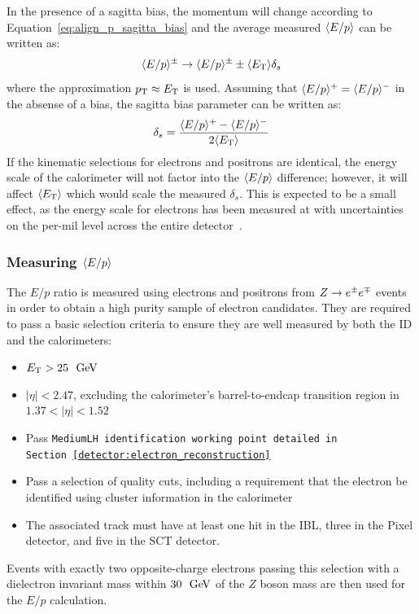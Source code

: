 In the presence of a sagitta bias, the momentum will change according to Equation~\ref{eq:align_p_sagitta_bias} and the average measured $\langle E/p\rangle$ can be written as:
\begin{equation}
  \langle E/p\rangle^{\pm}\rightarrow\langle E/p\rangle^{\pm}\pm\langle E_{\mathrm{T}}\rangle\delta_s
\end{equation}
where the approximation $p_{\mathrm{T}}\approx E_{\mathrm{T}}$ is used.
Assuming that $\langle E/p\rangle^+ = \langle E/p\rangle^-$ in the absense of a bias, the sagitta bias parameter can be written as:
\begin{equation}
  \delta_s = \frac{\eop^+ - \eop^-}{2\langle\et\rangle}
\label{eq:align_eop_sagitta}
\end{equation}
If the kinematic selections for electrons and positrons are identical, the energy scale of the calorimeter will not factor into the $\langle E/p\rangle$ difference; however, it will affect $\langle E_{\mathrm{T}}\rangle$ which would scale the measured $\delta_s$.
This is expected to be a small effect, as the energy scale for electrons has been measured at  with uncertainties on the per-mil level across the entire detector~\cite{2016.electron-photon-calibration}.

\subsubsection{Measuring $\langle E/p\rangle$}
The $E/p$ ratio is measured using electrons and positrons from $Z\rightarrow e^{\pm}e^{\mp}$ events in order to obtain a high purity sample of electron candidates.
They are required to pass a basic selection criteria to ensure they are well measured by both the ID and the calorimeters:
\begin{itemize}
  \item $\et > 25~\gev$
  \item $|\eta| < 2.47$, excluding the calorimeter's barrel-to-endcap transition region in $1.37<|\eta|<1.52$
  \item Pass \tt{MediumLH} identification working point detailed in Section~\ref{detector:electron_reconstruction}
  \item Pass a selection of quality cuts, including a requirement that the electron be identified using cluster information in the calorimeter %
  \item The associated track must have at least one hit in the IBL, three in the Pixel detector, and five in the SCT detector.
\end{itemize}
Events with exactly two opposite-charge electrons passing this selection with a dielectron invariant mass within $30~\gev$ of the $Z$ boson mass are then used for the $E/p$ calculation.

